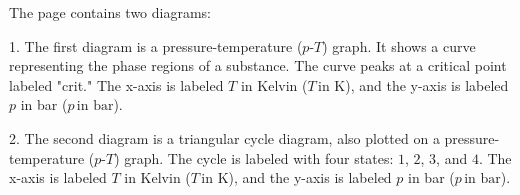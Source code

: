 The page contains two diagrams:  

1. The first diagram is a pressure-temperature (\(p\)-\(T\)) graph. It shows a curve representing the phase regions of a substance. The curve peaks at a critical point labeled "crit." The x-axis is labeled \(T\) in Kelvin (\(T \, \text{in K}\)), and the y-axis is labeled \(p\) in bar (\(p \, \text{in bar}\)).  

2. The second diagram is a triangular cycle diagram, also plotted on a pressure-temperature (\(p\)-\(T\)) graph. The cycle is labeled with four states: \(1\), \(2\), \(3\), and \(4\). The x-axis is labeled \(T\) in Kelvin (\(T \, \text{in K}\)), and the y-axis is labeled \(p\) in bar (\(p \, \text{in bar}\)).